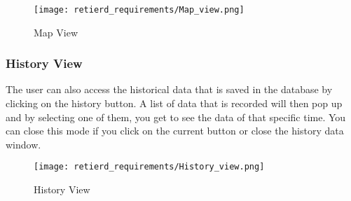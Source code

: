 \documentclass[../document]{subfiles}
\begin{document}
\begin{figure}[H]
	\centering
	\texttt{[image: retierd\_requirements/Map\_view.png]}
	\caption{Map View}
\end{figure}

\newpage
\subsubsection{History View}
The user can also access the historical data that is saved in the database by clicking on the history button. A list of data that is recorded will then pop up and by selecting one of them, you get to see the data of that specific time. You can close this mode if you click on the current button or close the history data window.

\begin{figure}[H]
	\centering
	\texttt{[image: retierd\_requirements/History\_view.png]}
	\caption{History View}
\end{figure}
\end{document}
